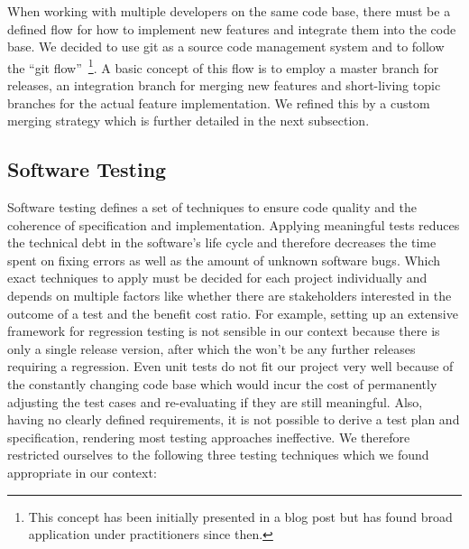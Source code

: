 When working with multiple developers on the same code base, there must be a defined flow for how to implement new features and integrate them into the code base.
We decided to use git as a source code management system and to follow the \enquote{git flow}~\footnote{This concept has been initially presented in a blog post \cite{gitflow} but has found broad application under practitioners since then.}.
A basic concept of this flow is to employ a master branch for releases, an integration branch for merging new features and short-living topic branches for the actual feature implementation.
We refined this by a custom merging strategy which is further detailed in the next subsection.

\subsection{Software Testing}\label{subsec:sw_testing}
Software testing defines a set of techniques to ensure code quality and the coherence of specification and implementation.
Applying meaningful tests reduces the technical debt in the software's life cycle and therefore decreases the time spent on fixing errors as well as the amount of unknown software bugs.
Which exact techniques to apply must be decided for each project individually and depends on multiple factors like whether there are stakeholders interested in the outcome of a test and the benefit cost ratio.
For example, setting up an extensive framework for regression testing is not sensible in our context because there is only a single release version, after which the won't be any further releases requiring a regression.
Even unit tests do not fit our project very well because of the constantly changing code base which would incur the cost of permanently adjusting the test cases and re-evaluating if they are still meaningful.
Also, having no clearly defined requirements, it is not possible to derive a test plan and specification, rendering most testing approaches ineffective.
We therefore restricted ourselves to the following three testing techniques which we found appropriate in our context:
